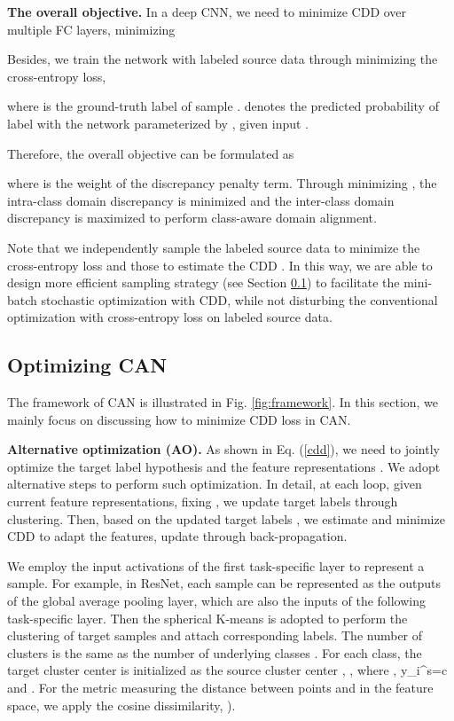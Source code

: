 \documentclass[10pt,twocolumn,letterpaper]{article}
\begin{document}
\textbf{The overall objective.}
In a deep CNN,
we need to minimize CDD over multiple FC layers, \ie
minimizing




Besides,
we train the network with labeled source data through minimizing the cross-entropy loss,

where  is the ground-truth label of sample .
 denotes the predicted probability of label  with the network 
parameterized by , given input .

Therefore, the overall objective can be formulated as  

where 
 is the weight of the discrepancy penalty term.
Through minimizing ,
the intra-class domain discrepancy is minimized and the inter-class domain discrepancy is maximized
to perform class-aware domain alignment. 

Note that we independently sample the labeled source data 
to minimize the cross-entropy loss 
and those to estimate the CDD .
In this way, we are able to design more efficient sampling strategy (see Section \ref{sec:can_training}) to facilitate the mini-batch stochastic optimization with CDD,
while not disturbing the conventional optimization with cross-entropy loss on labeled source data.











\subsection{Optimizing CAN} \label{sec:can_training}
The framework of CAN is illustrated in Fig. \ref{fig:framework}.
In this section, we mainly focus on discussing how to minimize CDD loss in CAN.


\textbf{Alternative optimization (AO).}
As shown in Eq. (\ref{cdd}),
we need to jointly optimize the target label hypothesis 
and the feature representations .
We adopt alternative steps to perform such optimization.
In detail, at each loop, given current feature representations, \ie fixing , 
we update target labels through clustering.
Then, based on the updated target labels , 
we estimate and minimize CDD to adapt the features, 
\ie update  through back-propagation.

We employ the input activations  of the first task-specific layer 
to represent a sample.
For example, in ResNet, each sample can be  
represented as the outputs of the global average pooling layer,
which are also the inputs of the following task-specific layer.
Then the spherical K-means is adopted to perform the clustering of target samples and 
attach corresponding labels. 
The number of clusters is the same as the number of underlying classes . 
For each class,
the target cluster center  is initialized as the  
source cluster center , \ie
, 
where
,
y_i^s=c
and . 
For the metric measuring the distance between points  and  
in the feature space,
we apply the cosine dissimilarity, \ie
).
\end{document}
